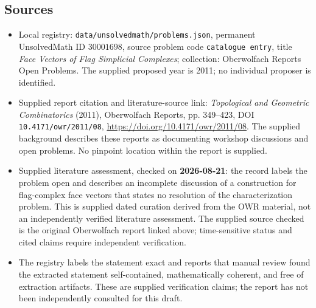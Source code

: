 \documentclass[11pt]{article}
\begin{document}
\subsection{Sources}
\begin{itemize}
\item Local registry: \texttt{data/unsolvedmath/problems.json}, permanent UnsolvedMath ID \(30001698\), source problem code \texttt{catalogue entry}, title \emph{Face Vectors of Flag Simplicial Complexes}; collection: Oberwolfach Reports Open Problems. The supplied proposed year is 2011; no individual proposer is identified.
\item Supplied report citation and literature-source link: \emph{Topological and Geometric Combinatorics} (2011), Oberwolfach Reports, pp. 349--423, DOI \texttt{10.4171/owr/2011/08}, \url{https://doi.org/10.4171/owr/2011/08}. The supplied background describes these reports as documenting workshop discussions and open problems. No pinpoint location within the report is supplied.
\item Supplied literature assessment, checked on \textbf{2026-08-21}: the record labels the problem open and describes an incomplete discussion of a construction for flag-complex face vectors that states no resolution of the characterization problem. This is supplied dated curation derived from the OWR material, not an independently verified literature assessment. The supplied source checked is the original Oberwolfach report linked above; time-sensitive status and cited claims require independent verification.
\item The registry labels the statement exact and reports that manual review found the extracted statement self-contained, mathematically coherent, and free of extraction artifacts. These are supplied verification claims; the report has not been independently consulted for this draft.
\end{itemize}
\end{document}
